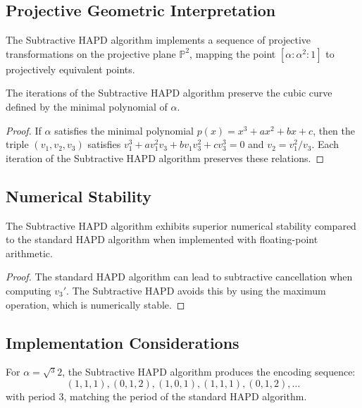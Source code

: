 \subsection{Projective Geometric Interpretation}

\begin{proposition}\label{prop:geometric_action}
The Subtractive HAPD algorithm implements a sequence of projective transformations on the projective plane $\mathbb{P}^2$, mapping the point $[\alpha:\alpha^2:1]$ to projectively equivalent points.
\end{proposition}

\begin{theorem}\label{thm:invariant_curves}
The iterations of the Subtractive HAPD algorithm preserve the cubic curve defined by the minimal polynomial of $\alpha$.
\end{theorem}

\begin{proof}
If $\alpha$ satisfies the minimal polynomial $p(x) = x^3 + ax^2 + bx + c$, then the triple $(v_1, v_2, v_3)$ satisfies $v_1^3 + av_1^2v_3 + bv_1v_3^2 + cv_3^3 = 0$ and $v_2 = v_1^2/v_3$. Each iteration of the Subtractive HAPD algorithm preserves these relations.
\end{proof}

\subsection{Numerical Stability}

\begin{proposition}\label{prop:numerical_stability}
The Subtractive HAPD algorithm exhibits superior numerical stability compared to the standard HAPD algorithm when implemented with floating-point arithmetic.
\end{proposition}

\begin{proof}
The standard HAPD algorithm can lead to subtractive cancellation when computing $v_3'$. The Subtractive HAPD avoids this by using the maximum operation, which is numerically stable.
\end{proof}

\subsection{Implementation Considerations}

\begin{example}\label{ex:cube_root_implementation}
For $\alpha = \sqrt{^3}{2}$, the Subtractive HAPD algorithm produces the encoding sequence:
\begin{equation}
(1,1,1), (0,1,2), (1,0,1), (1,1,1), (0,1,2), \ldots
\end{equation}
with period 3, matching the period of the standard HAPD algorithm.
\end{example}


